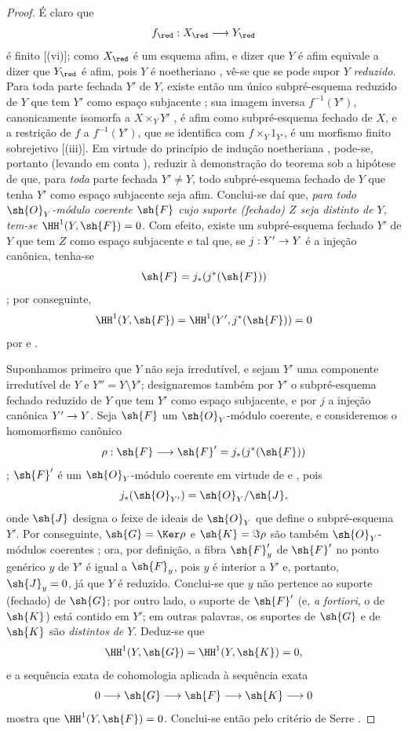 \documentclass[oneside,10pt]{amsart}
\makeatletter
\newcommand{\ega@arrow}[2]{\mathchoice{#1}{#2}{#2}{#2}}
\renewcommand{\to}{\ega@arrow{\longrightarrow}{\rightarrow}}
\makeatother
\begin{document}
\begin{proof}
É claro que
\[
  f_\red:X_\red\to Y_\red
\]
é finito [(vi)];
como $X_\red$ é um esquema afim, e dizer que $Y$ é afim equivale a dizer que $Y_\red$ é afim, pois $Y$ é noetheriano , vê-se que se pode supor $Y$ \emph{reduzido}.
Para toda parte fechada $Y'$ de $Y$, existe então um único subpré-esquema reduzido de $Y$ que tem $Y'$ como espaço subjacente ;
sua imagem inversa $f^{-1}(Y')$, canonicamente isomorfa a $X\times_Y Y'$ , é afim como subpré-esquema fechado de $X$, e a restrição de $f$ a $f^{-1}(Y')$, que se identifica com $f\times_Y1_{Y'}$, é um morfismo finito sobrejetivo [(iii)].
Em virtude do princípio de indução noetheriana , pode-se, portanto (levando em conta ), reduzir à demonstração do teorema sob a hipótese de que, para \emph{toda} parte fechada $Y'\neq Y$, todo subpré-esquema fechado de $Y$ que tenha $Y'$ como espaço subjacente seja afim.
Conclui-se daí que, \emph{para todo $\sh{O}_Y$-módulo coerente $\sh{F}$ cujo suporte (fechado) $Z$ seja distinto de $Y$, tem-se $\HH^1(Y,\sh{F})=0$}.
Com efeito, existe um subpré-esquema fechado $Y'$ de $Y$ que tem $Z$ como espaço subjacente e tal que, se $j:Y'\to Y$ é a injeção canônica, tenha-se
\[
  \sh{F}=j_*(j^*(\sh{F}))
\]
;
por conseguinte,
\[
  \HH^1(Y,\sh{F})=\HH^1(Y',j^*(\sh{F}))=0
\]
por  e .

Suponhamos primeiro que $Y$ não seja irredutível, e sejam $Y'$ uma componente irredutível de $Y$ e $Y''=Y\setminus Y'$;
designaremos também por $Y'$ o subpré-esquema fechado reduzido de $Y$ que tem $Y'$ como espaço subjacente, e por $j$ a injeção canônica $Y'\to Y$.
Seja $\sh{F}$ um $\sh{O}_Y$-módulo coerente, e consideremos o homomorfismo canônico
\[
  \rho:\sh{F}\to\sh{F}'=j_*(j^*(\sh{F}))
\]
;
$\sh{F}'$ é um $\sh{O}_Y$-módulo coerente em virtude de  e , pois
\[
  j_*(\sh{O}_{Y'})=\sh{O}_Y/\sh{J},
\]
onde $\sh{J}$ designa o feixe de ideais de $\sh{O}_Y$ que define o subpré-esquema $Y'$.
Por conseguinte, $\sh{G}=\Ker\rho$ e $\sh{K}=\Im\rho$ são também $\sh{O}_Y$-módulos coerentes ;
ora, por definição, a fibra $\sh{F}'_y$ de $\sh{F}'$ no ponto genérico $y$ de $Y'$ é igual a $\sh{F}_y$, pois $y$ é interior a $Y'$ e, portanto, $\sh{J}_y=0$, já que $Y$ é reduzido.
Conclui-se que $y$ não pertence ao suporte (fechado) de $\sh{G}$;
por outro lado, o suporte de $\sh{F}'$ (e, \emph{a fortiori}, o de $\sh{K}$) está contido em $Y'$;
em outras palavras, os suportes de $\sh{G}$ e de $\sh{K}$ são \emph{distintos de $Y$}.
Deduz-se que
\[
  \HH^1(Y,\sh{G})=\HH^1(Y,\sh{K})=0,
\]
e a sequência exata de cohomologia aplicada à sequência exata
\[
  0\to\sh{G}\to\sh{F}\to\sh{K}\to0
\]
mostra que $\HH^1(Y,\sh{F})=0$.
Conclui-se então pelo critério de Serre .


\end{proof}
\end{document}
